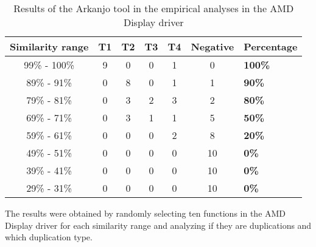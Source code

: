 \begin{table}
\begin{tabular}{ | c | c | c | c | c | c | m{8em} | }

\hline

\textbf{Similarity range} & \textbf{T1} & \textbf{T2} & T3 & T4
& \textbf{Negative} & \textbf{Percentage} \\ \hline 
99\% - 100\% & 9 & 0 & 0 & 1 & 0 & \textbf{100\%} \\ \hline
89\% - 91\% & 0 & 8 & 0 & 1 & 1 & \textbf{90\%} \\ \hline
79\% - 81\% & 0 & 3 & 2 & 3 & 2 & \textbf{80\%} \\ \hline
69\% - 71\% & 0 & 3 & 1 & 1 & 5 & \textbf{50\%} \\ \hline
59\% - 61\% & 0 & 0 & 0 & 2 & 8 & \textbf{20\%} \\ \hline
49\% - 51\% & 0 & 0 & 0 & 0 & 10 & \textbf{0\%} \\ \hline
39\% - 41\% & 0 & 0 & 0 & 0 & 10 & \textbf{0\%} \\ \hline
29\% - 31\% & 0 & 0 & 0 & 0 & 10 & \textbf{0\%} \\ \hline

\hline

\end{tabular}
\caption{Results of the Arkanjo tool in the empirical analyses in the AMD Display driver}
\label{tab:emp}

The results were obtained by randomly selecting ten functions in the AMD Display driver for 
each similarity range and analyzing if they are duplications and which duplication type.

\end{table}
